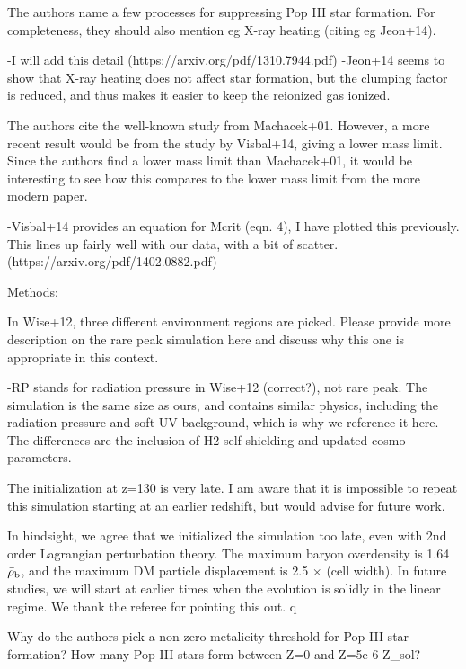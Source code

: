 \documentclass[11pt]{article}
\newenvironment{referee}[1][]{%
    \ignorespaces%
    \begin{mdframed}[style=myquotestyle,#1]%
}{%
    \end{mdframed}%
    \ignorespacesafterend%
}%
\begin{document}
\begin{referee}
The authors name a few processes for suppressing Pop III star formation. For completeness, they should also mention eg X-ray heating (citing eg Jeon+14).
\end{referee}
-I will add this detail (https://arxiv.org/pdf/1310.7944.pdf)
-Jeon+14 seems to show that X-ray heating does not affect star formation, but 
the clumping factor is reduced, and thus makes it easier to keep the reionized 
gas ionized. 

\begin{referee}
The authors cite the well-known study from Machacek+01. However, a more recent result would be from the study by Visbal+14, giving a lower mass limit. Since the authors find a lower mass limit than Machacek+01, it would be interesting to see how this compares to the lower mass limit from the more modern paper.
\end{referee}
-Visbal+14 provides an equation for Mcrit (eqn. 4), I have plotted this previously. This lines up fairly well with our data, with a bit of scatter.  (https://arxiv.org/pdf/1402.0882.pdf) 

\begin{referee}
Methods:

In Wise+12, three different environment regions are picked. Please provide more description on the rare peak simulation here and discuss why this one is appropriate in this context.
\end{referee}
-RP stands for radiation pressure in Wise+12 (correct?), not rare peak. The simulation is the same size as ours, and contains similar physics, including the radiation pressure and soft UV background, which is why we reference it here. The differences are the inclusion of H2 self-shielding and updated cosmo parameters.
 
\begin{referee}
The initialization at z=130 is very late. I am aware that it is impossible to repeat this simulation starting at an earlier redshift, but would advise for future work.
\end{referee}

In hindsight, we agree that we initialized the simulation too late, even with 2nd order Lagrangian perturbation theory.  The maximum baryon overdensity is 1.64$\bar{\rho}_{\rm b}$, and the maximum DM particle displacement is 2.5 $\times$ (cell width).  In future studies, we will start at earlier times when the evolution is solidly in the linear regime.  We thank the referee for pointing this out.
q
\begin{referee}
Why do the authors pick a non-zero metalicity threshold for Pop III star formation? How many Pop III stars form between Z=0 and Z=5e-6 Z\_sol?
\end{referee}
\end{document}
